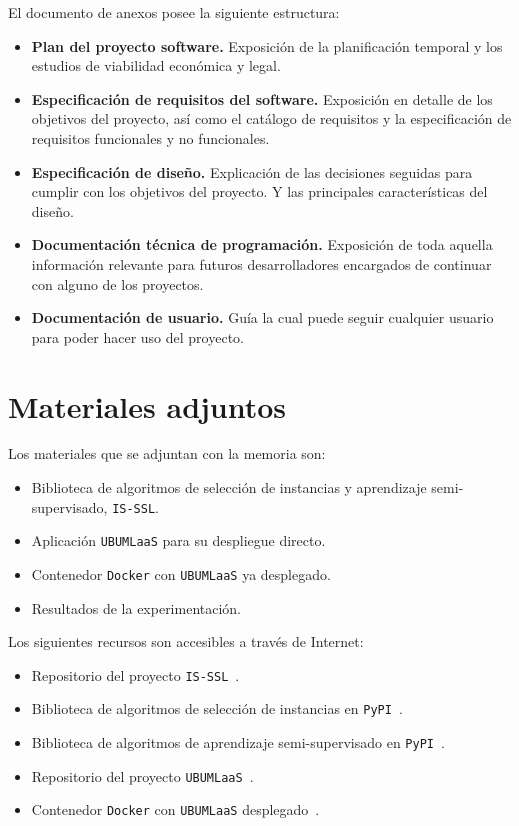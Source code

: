 El documento de anexos posee la siguiente estructura:
\begin{itemize}
\item \textbf{Plan del proyecto software.} Exposición de la planificación temporal y los estudios de viabilidad económica y legal.
\item \textbf{Especificación de requisitos del software.} Exposición en detalle de los objetivos del proyecto, así como el catálogo de requisitos y la especificación de requisitos funcionales y no funcionales.
\item \textbf{Especificación de diseño.} Explicación de las decisiones seguidas para cumplir con los objetivos del proyecto. Y las principales características del diseño.
\item \textbf{Documentación técnica de programación.} Exposición de toda aquella información relevante para futuros desarrolladores encargados de continuar con alguno de los proyectos.
\item \textbf{Documentación de usuario.} Guía la cual puede seguir cualquier usuario para poder hacer uso del proyecto.
\end{itemize}


\section{Materiales adjuntos}\label{materiales-adjuntos}
Los materiales que se adjuntan con la memoria son:
\begin{itemize}
\item Biblioteca de algoritmos de selección de instancias y aprendizaje semi-supervisado, \texttt{IS-SSL}.
\item Aplicación \texttt{UBUMLaaS} para su despliegue directo.
\item Contenedor \texttt{Docker} con \texttt{UBUMLaaS} ya desplegado.
\item Resultados de la experimentación.
\end{itemize}

Los siguientes recursos son accesibles a través de Internet:
\begin{itemize}
\item Repositorio del proyecto \texttt{IS-SSL}~\cite{ISSSLRepo}.
\item Biblioteca de algoritmos de selección de instancias en \texttt{PyPI}~\cite{ISPyPI}.
\item Biblioteca de  algoritmos de aprendizaje semi-supervisado en \texttt{PyPI}~\cite{SSLPyPI}.
\item Repositorio del proyecto \texttt{UBUMLaaS}~\cite{UBUMLaaSRepo}.
\item Contenedor \texttt{Docker} con \texttt{UBUMLaaS} desplegado~\cite{UBUMLaaSDocker}.
\end{itemize}
